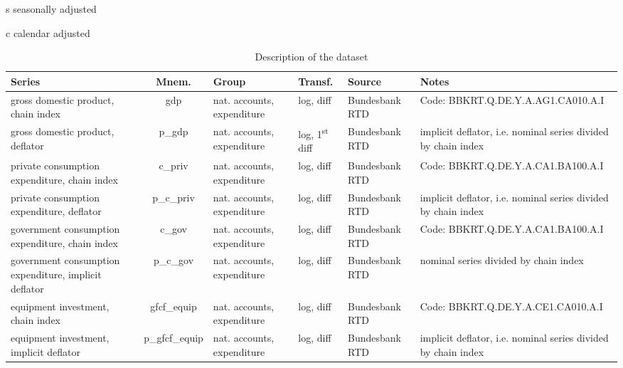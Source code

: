\documentclass[notitlepage,a4paper,12pt]{article}
\begin{document}
\begingroup\fontsize{8}{10}\selectfont
\begin{ThreePartTable}
    \begin{TableNotes}
    \item[s] seasonally adjusted
    \item[c] calendar adjusted
    \end{TableNotes}
\begin{landscape}
\begin{longtable}{| l | c | l | l | l | l |} 
    \caption{Description of the dataset} \\%
    \toprule
    \rowcolor{gray!50}
    \textbf{Series} & \textbf{Mnem.} &  \textbf{Group} & \textbf{Transf.} & \textbf{Source} & \textbf{Notes} \\
    \midrule
    gross domestic product, chain index\tnote{s,c} & gdp &  nat. accounts, expenditure & log, diff  & Bundesbank RTD & Code: BBKRT.Q.DE.Y.A.AG1.CA010.A.I  \\ \hline 
    gross domestic product, deflator\tnote{s,c} & p\_gdp &  nat. accounts, expenditure &  log, 1\textsuperscript{st} diff  & Bundesbank RTD & implicit deflator, i.e. nominal series divided by chain index  \\ \hline 
    private consumption expenditure, chain index\tnote{s,c} & c\_priv &  nat. accounts, expenditure &  log, diff  & Bundesbank RTD & Code: BBKRT.Q.DE.Y.A.CA1.BA100.A.I  \\ \hline 
    private consumption expenditure, deflator\tnote{s,c} & p\_c\_priv &  nat. accounts, expenditure &  log, diff  & Bundesbank RTD & implicit deflator, i.e. nominal series divided by chain index  \\ \hline 
    government consumption expenditure, chain index\tnote{s,c} & c\_gov &  nat. accounts, expenditure &  log, diff  & Bundesbank RTD & Code: BBKRT.Q.DE.Y.A.CA1.BA100.A.I  \\ \hline 
    government consumption expenditure, implicit deflator\tnote{s,c} & p\_c\_gov &  nat. accounts, expenditure &  log, diff  & Bundesbank RTD & nominal series divided by chain index  \\ \hline
    equipment investment, chain index\tnote{s,c} & gfcf\_equip & nat. accounts, expenditure & log, diff  & Bundesbank RTD & Code: BBKRT.Q.DE.Y.A.CE1.CA010.A.I\\ \hline
    equipment investment, implicit deflator\tnote{s,c} & p\_gfcf\_equip & nat. accounts, expenditure & log, diff  & Bundesbank RTD & implicit deflator, i.e. nominal series divided by chain index\\ \hline

\end{longtable}
\end{landscape}
\end{ThreePartTable}
\end{document}
